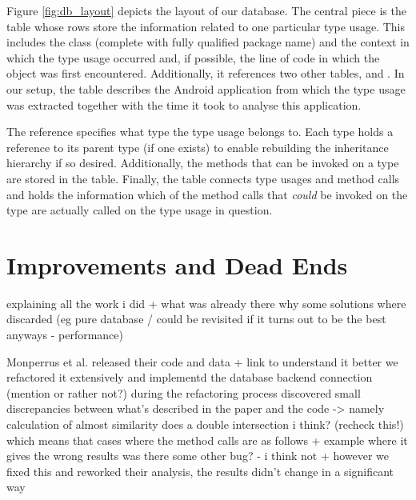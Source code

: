 Figure \ref{fig:db_layout} depicts the layout of our database.
The central piece is the  table whose rows store the information related to one particular type usage.
This includes the class (complete with fully qualified package name) and the context in which the type usage occurred and, if possible, the line of code in which the object was first encountered.
Additionally, it references two other tables,  and .
In our setup, the  table describes the Android application from which the type usage was extracted together with the time it took to analyse this application.

The  reference specifies what type the type usage belongs to. Each type holds a reference to its parent type (if one exists) to enable rebuilding the inheritance hierarchy if so desired.
Additionally, the methods that can be invoked on a type are stored in the  table.
Finally, the  table connects type usages and method calls and holds the information which of the method calls that \emph{could} be invoked on the type are actually called on the type usage in question.


\section{Improvements and Dead Ends}\label{sec:deadends}

explaining all the work i did + what was already there
why some solutions where discarded (eg pure database / could be revisited if it turns out to be the best anyways - performance)

Monperrus et al. released their code and data + link
to understand it better we refactored it extensively and implementd the database backend connection
(mention or rather not?) during the refactoring process discovered small discrepancies between what's described in the paper and the code
-> namely calculation of almost similarity does a double intersection i think? (recheck this!)
which means that cases where the method calls are as follows + example where it gives the wrong results
was there some other bug? - i think not
+ however we fixed this and reworked their analysis, the results didn't change in a significant way


